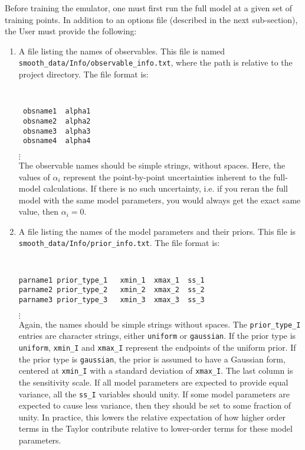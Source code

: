 \documentclass[UserManual.tex]{subfiles}
\begin{document}
Before training the emulator, one must first run the full model at a given set of training points. In addition to an options file (described in the next sub-section), the User must provide the following:
\begin{enumerate}\itemsep=0pt
\item A file listing the names of observables. This file is named\\{\tt smooth\_data/Info/observable\_info.txt}, where the path is relative to the project directory. The file format is:\\
{\tt
\begin{verbatim}
 obsname1  alpha1
 obsname2  alpha2
 obsname3  alpha3
 obsname4  alpha4
\end{verbatim}}
\vspace*{-16pt}
 \hspace*{28pt}$\vdots$\\
The observable names should be simple strings, without spaces. Here, the values of $\alpha_i$ represent the point-by-point uncertainties inherent to the full-model calculations. If there is no such uncertainty, i.e. if you reran the full model with the same model parameters, you would always get the exact same value, then $\alpha_i=0$.

\item A file listing the names of the model parameters and their priors. This file is {\tt smooth\_data/Info/prior\_info.txt}. The file format is:\\
{\tt
\begin{verbatim}
parname1 prior_type_1	xmin_1  xmax_1  ss_1
parname2 prior_type_2	xmin_2  xmax_2  ss_2
parname3 prior_type_3	xmin_3  xmax_3  ss_3 
\end{verbatim}}
\vspace*{-16pt}
 \hspace*{28pt}$\vdots$\\
Again, the names should be simple strings without spaces. The {\tt prior\_type\_I} entries are character strings, either {\tt uniform} or {\tt gaussian}. If the prior type is {\tt uniform}, {\tt xmin\_I} and {\tt xmax\_I} represent the endpoints of the uniform prior. If the prior type is {\tt gaussian}, the prior is assumed to have a Gaussian form, centered at {\tt xmin\_I} with a standard deviation of {\tt xmax\_I}. The last column is the sensitivity scale. If all model parameters are expected to provide equal variance, all the {\tt ss\_I} variables should unity. If some model parameters are expected to cause less variance, then they should be set to some fraction of unity. In practice, this lowers the relative expectation of how higher order terms in the Taylor contribute relative to lower-order terms for these model parameters.


\end{enumerate}
\end{document}

